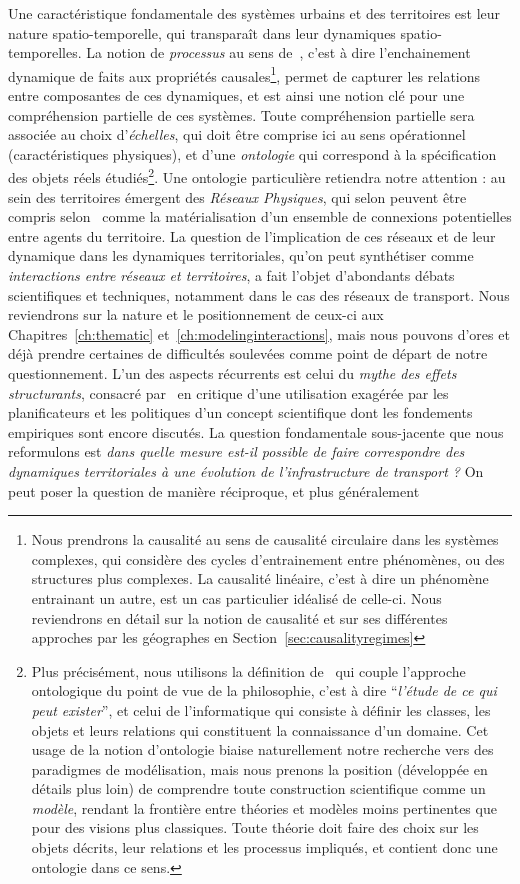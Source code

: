 {Une caractéristique fondamentale des systèmes urbains et des territoires est leur nature spatio-temporelle, qui transparaît dans leur dynamiques spatio-temporelles. La notion de \emph{processus} au sens de~\cite{hypergeo}, c'est à dire l'enchainement dynamique de faits aux propriétés causales\footnote{Nous prendrons la causalité au sens de causalité circulaire dans les systèmes complexes, qui considère des cycles d'entrainement entre phénomènes, ou des structures plus complexes. La causalité linéaire, c'est à dire un phénomène entrainant un autre, est un cas particulier idéalisé de celle-ci. Nous reviendrons en détail sur la notion de causalité et sur ses différentes approches par les géographes en Section~\ref{sec:causalityregimes}}, permet de capturer les relations entre composantes de ces dynamiques, et est ainsi une notion clé pour une compréhension partielle de ces systèmes. Toute compréhension partielle sera associée au choix d'\emph{échelles}, qui doit être comprise ici au sens opérationnel (caractéristiques physiques), et d'une \emph{ontologie} qui correspond à la spécification des objets réels étudiés\footnote{Plus précisément, nous utilisons la définition de~\cite{livet2010} qui couple l'approche ontologique du point de vue de la philosophie, c'est à dire ``\textit{l'étude de ce qui peut exister}'', et celui de l'informatique qui consiste à définir les classes, les objets et leurs relations qui constituent la connaissance d'un domaine. Cet usage de la notion d'ontologie biaise naturellement notre recherche vers des paradigmes de modélisation, mais nous prenons la position (développée en détails plus loin) de comprendre toute construction scientifique comme un \emph{modèle}, rendant la frontière entre théories et modèles moins pertinentes que pour des visions plus classiques. Toute théorie doit faire des choix sur les objets décrits, leur relations et les processus impliqués, et contient donc une ontologie dans ce sens.}. Une ontologie particulière retiendra notre attention : au sein des territoires émergent des \emph{Réseaux Physiques}, qui selon peuvent être compris selon~\cite{dupuy1987vers} comme la matérialisation d'un ensemble de connexions potentielles entre agents du territoire. La question de l'implication de ces réseaux et de leur dynamique dans les dynamiques territoriales, qu'on peut synthétiser comme \emph{interactions entre réseaux et territoires}, a fait l'objet d'abondants débats scientifiques et techniques, notamment dans le cas des réseaux de transport. Nous reviendrons sur la nature et le positionnement de ceux-ci aux Chapitres~\ref{ch:thematic} et~\ref{ch:modelinginteractions}, mais nous pouvons d'ores et déjà prendre certaines de difficultés soulevées comme point de départ de notre questionnement. L'un des aspects récurrents est celui du \emph{mythe des effets structurants}, consacré par~\cite{offner1993effets} en critique d'une utilisation exagérée par les planificateurs et les politiques d'un concept scientifique dont les fondements empiriques sont encore discutés. La question fondamentale sous-jacente que nous reformulons est \textit{dans quelle mesure est-il possible de faire correspondre des dynamiques territoriales à une évolution de l'infrastructure de transport ?} On peut poser la question de manière réciproque, et plus généralement }
